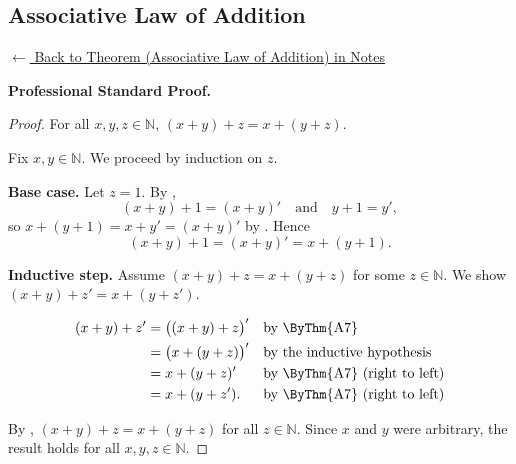 
\subsection*{Associative Law of Addition}
\label{prf:landau-plus-assoc}

\begin{remark*}[Return]
\hyperref[thm:landau-plus-assoc]{$\leftarrow$ Back to Theorem
(Associative Law of Addition) in Notes}
\end{remark*}

\textbf{Professional Standard Proof.}~\\
\begin{proof}
\Claim For all $x, y, z \in \mathbb{N}$, $(x + y) + z = x + (y + z)$.

Fix $x, y \in \mathbb{N}$. We proceed by induction on $z$.

\textbf{Base case.} Let $z = 1$. By ,
\[
  (x + y) + 1 = (x + y)' \quad \text{and} \quad y + 1 = y',
\]
so $x + (y + 1) = x + y' = (x + y)'$ by . Hence
\[
  (x + y) + 1 = (x + y)' = x + (y + 1).
\]

\textbf{Inductive step.} Assume $(x + y) + z = x + (y + z)$ for some
$z \in \mathbb{N}$. We show $(x + y) + z' = x + (y + z')$.

\[
\begin{aligned}
  (x + y) + z'
    &= \bigl((x + y) + z\bigr)'  && \text{by \ByThm{A7}} \\
    &= \bigl(x + (y + z)\bigr)'  && \text{by the inductive hypothesis} \\
    &= x + (y + z)'              && \text{by \ByThm{A7} (right to left)} \\
    &= x + (y + z').             && \text{by \ByThm{A7} (right to left)}
\end{aligned}
\]

By , $(x + y) + z = x + (y + z)$ for all
$z \in \mathbb{N}$. Since $x$ and $y$ were arbitrary, the result holds
for all $x, y, z \in \mathbb{N}$.
\end{proof}


